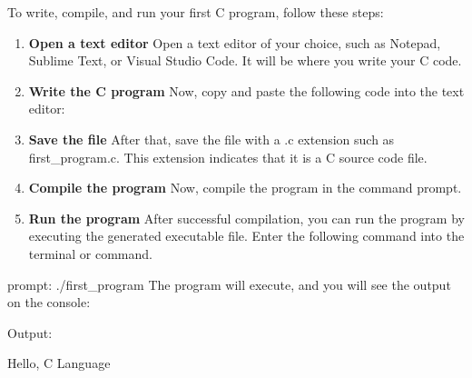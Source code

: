 \documentclass[11pt]{article}
\begin{document}
To write, compile, and run your first C program, follow these steps:
\begin{enumerate}
	\item \textbf{Open a text editor} Open a text editor of your choice, such as Notepad, Sublime Text, or Visual Studio Code. It will be where you write your C code.
	\item \textbf{Write the C program} Now, copy and paste the following code into the text editor:
	
	\item \textbf{Save the file} After that, save the file with a .c extension such as first\_program.c. This extension indicates that it is a C source code file.
	\item \textbf{Compile the program} Now, compile the program in the command prompt.
	\item \textbf{Run the program} After successful compilation, you can run the program by executing the generated executable file. Enter the following command into the terminal or command.
\end{enumerate}

prompt:
./first\_program
The program will execute, and you will see the output on the console:

Output:

Hello, C Language
\end{document}
